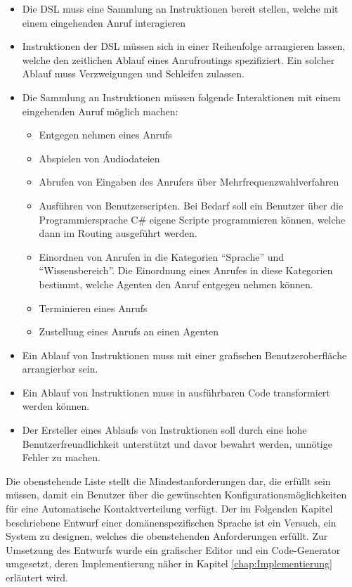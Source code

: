 \begin{itemize}
\item Die DSL muss eine Sammlung an Instruktionen bereit stellen, welche mit einem eingehenden Anruf interagieren
\item Instruktionen der DSL müssen sich in einer Reihenfolge arrangieren lassen, welche den zeitlichen Ablauf eines Anrufroutings spezifiziert. Ein solcher Ablauf muss Verzweigungen und Schleifen zulassen.
\item Die Sammlung an Instruktionen müssen folgende Interaktionen mit einem eingehenden Anruf möglich machen:
	\begin{itemize}
	\item Entgegen nehmen eines Anrufs
	\item Abspielen von Audiodateien 
	\item Abrufen von Eingaben des Anrufers über Mehrfrequenzwahlverfahren
	\item Ausführen von Benutzerscripten. Bei Bedarf soll ein Benutzer über die Programmiersprache C\# eigene Scripte programmieren können, welche dann im Routing ausgeführt werden.
	\item Einordnen von Anrufen in die Kategorien ``Sprache'' und ``Wissensbereich''. Die Einordnung eines Anrufes in diese Kategorien bestimmt, welche Agenten den Anruf entgegen nehmen können.
	\item Terminieren eines Anrufs
	\item Zustellung eines Anrufs an einen Agenten
	\end{itemize}
\item Ein Ablauf von Instruktionen muss mit einer grafischen Benutzeroberfläche arrangierbar sein.
\item Ein Ablauf von Instruktionen muss in ausführbaren Code transformiert werden können.
\item Der Ersteller eines Ablaufs von Instruktionen soll durch eine hohe Benutzerfreundlichkeit unterstützt und davor bewahrt werden, unnötige Fehler zu machen.  
\end{itemize}
Die obenstehende Liste stellt die Mindestanforderungen dar, die erfüllt sein müssen, damit ein Benutzer über die gewünschten Konfigurationsmöglichkeiten für eine Automatische Kontaktverteilung verfügt. Der im Folgenden Kapitel beschriebene Entwurf einer domänenspezifischen Sprache ist ein Versuch, ein System zu designen, welches die obenstehenden Anforderungen erfüllt. Zur Umsetzung des Entwurfs wurde ein grafischer Editor und ein Code-Generator umgesetzt, deren Implementierung näher in Kapitel \ref{chap:Implementierung} erläutert wird.

